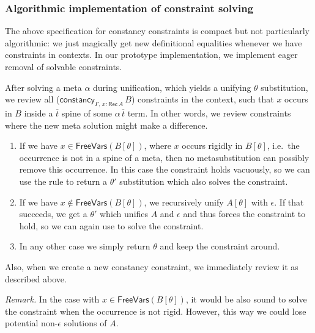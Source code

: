 \documentclass[acmsmall,review,anonymous,prologue,dvipsnames]{acmart}\settopmatter{printfolios=true,printccs=false,printacmref=false}
\newcommand{\constancy}{\mathsf{constancy}}
\newcommand{\FreeVars}{\mathsf{FreeVars}}
\newcommand{\Rec}{\mathsf{Rec}}
\newcommand{\ol}[1]{\overline{#1}}
\theoremstyle{remark}
\begin{document}
\subsubsection{Algorithmic implementation of constraint solving}
\label{sec:algorithmic}
The above specification for constancy constraints is compact but not
particularly algorithmic: we just magically get new definitional equalities
whenever we have constraints in contexts. In our prototype implementation, we
implement eager removal of solvable constraints.

After solving a meta $\alpha$ during unification, which yields a unifying
$\theta$ substitution, we review all ($\constancy_{\Gamma,\,x : \Rec\,A}\,B$)
constraints in the context, such that $x$ occurs in $B$ inside a $\ol{t}$ spine
of some $\alpha\,\ol{t}$ term. In other words, we review constraints where the
new meta solution might make a difference.
\begin{enumerate}
  \item If we have $x \in \FreeVars(B[\theta])$, where $x$ occurs rigidly in
    $B[\theta]$, i.e.\ the occurrence is not in a spine of a meta, then no
    metasubstitution can possibly remove this occurrence. In this case the
    constraint holds vacuously, so we can use the rule
     to return a $\theta'$ substitution which also
    solves the constraint.
  \item If we have $x \notin \FreeVars(B[\theta])$, we recursively unify
    $A[\theta]$ with $\epsilon$. If that succeeds, we get a $\theta'$ which
    unifies $A$ and $\epsilon$ and thus forces the constraint to hold, so we
    can again use  to solve the constraint.
  \item
    In any other case we simply return $\theta$ and keep the constraint around.
\end{enumerate}
Also, when we create a new constancy constraint, we immediately review it
as described above.

\emph{Remark.} In the case with $x \in \FreeVars(B[\theta])$, it would be also
sound to solve the constraint when the occurrence is not rigid. However, this
way we could lose potential non-$\epsilon$ solutions of $A$.
\end{document}
